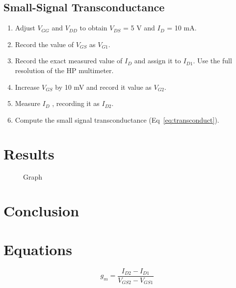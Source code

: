 \subsection{Small-Signal Transconductance}
\label{sec:nand}

\begin{enumerate}
\item Adjust $V_{GG}$ and $V_{DD}$ to obtain $V_{DS}$ = 5 V and $I_D$ = 10 mA.
\item Record the value of $V_{GS}$ as $V_{G1}$.
\item Record the exact measured value of $I_D$ and assign it to $I_{D1}$. Use the full resolution of the HP multimeter.
\item Increase $V_{GS}$ by 10 mV and record it value as $V_{G2}$.
\item Measure $I_D$ , recording it as $I_{D2}$.
\item Compute the small signal transconductance (Eq~\ref{eq:transconduct}).
\end{enumerate}

\section{Results}
\label{sec:results}

\begin{figure}[hbtp]
  \centering
  \resizebox{1.0\textwidth}{!}{}
  \caption{\label{fig:graph} Graph}
\end{figure}

\section{Conclusion}
\label{sec:conclusion}

 \section{Equations}
 \label{sec:equations}

%
 \begin{equation}
   \label{eq:transconduct}
   g_m = \frac{I_{D2}-I_{D1}}{V_{GS2}-V_{GS1}}
 \end{equation}


